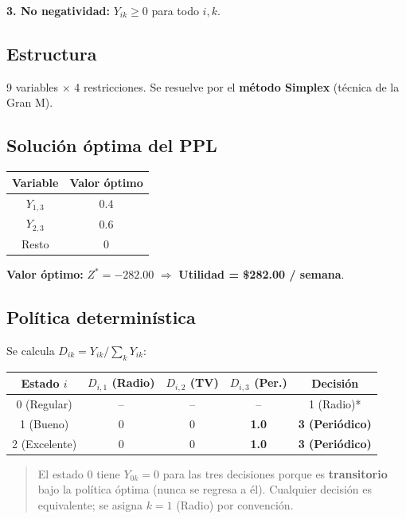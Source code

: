 \documentclass[12pt,a4paper]{article}
\begin{document}
\vspace{4pt}
\textbf{3. No negatividad:} $Y_{ik} \geq 0$ para todo $i,k$.

\subsection*{Estructura}

9 variables $\times$ 4 restricciones. Se resuelve por el \textbf{método Simplex} (técnica de la Gran M).

\subsection*{Solución óptima del PPL}

\begin{center}
\begin{tabular}{c c}
\toprule
\textbf{Variable} & \textbf{Valor óptimo} \\
\midrule
$Y_{1,3}$ & $0.4$ \\
$Y_{2,3}$ & $0.6$ \\
Resto     & $0$ \\
\bottomrule
\end{tabular}
\end{center}

\textbf{Valor óptimo:} $Z^* = -282.00$ \quad $\Rightarrow$ \quad \textbf{Utilidad = \$282.00 / semana}.

\subsection*{Política determinística}

Se calcula $D_{ik} = Y_{ik} / \sum_{k} Y_{ik}$:

\begin{center}
\begin{tabular}{c|c|c|c|c}
\toprule
\textbf{Estado $i$} & $D_{i,1}$ (Radio) & $D_{i,2}$ (TV) & $D_{i,3}$ (Per.) & \textbf{Decisión} \\
\midrule
0 (Regular)   & -- & -- & -- & 1 (Radio)* \\
1 (Bueno)     & 0 & 0 & \textbf{1.0} & \textbf{3 (Periódico)} \\
2 (Excelente) & 0 & 0 & \textbf{1.0} & \textbf{3 (Periódico)} \\
\bottomrule
\end{tabular}
\end{center}

\begin{quote}
\footnotesize *El estado 0 tiene $Y_{0k}=0$ para las tres decisiones porque es \textbf{transitorio} bajo la política óptima (nunca se regresa a él). Cualquier decisión es equivalente; se asigna $k=1$ (Radio) por convención.
\end{quote}
\end{document}
